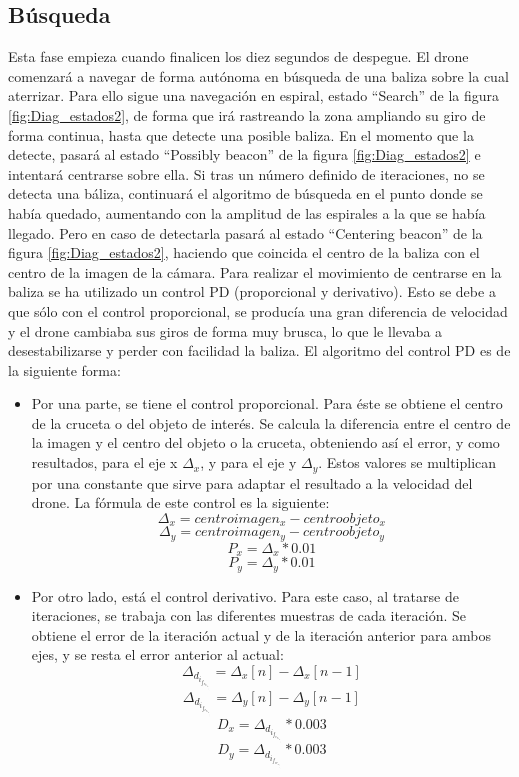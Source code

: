 \subsection{B\'usqueda}
\hspace{1 cm} Esta fase empieza cuando finalicen los diez segundos de despegue. El drone comenzar\'a a navegar de forma aut\'onoma en b\'usqueda de una baliza sobre la cual aterrizar. Para ello sigue una navegaci\'on en espiral, estado "`Search"' de la figura \ref{fig:Diag_estados2}, de forma que ir\'a rastreando la zona ampliando su giro de forma continua, hasta que detecte una posible baliza. En el momento que la detecte, pasar\'a al estado "`Possibly beacon"' de la figura \ref{fig:Diag_estados2} e intentar\'a centrarse sobre ella. Si tras un n\'umero definido de iteraciones, no se detecta una b\'aliza, continuar\'a el algoritmo de b\'usqueda en el punto donde se hab\'ia quedado, aumentando con la amplitud de las espirales a la que se hab\'ia llegado. Pero en caso de detectarla pasar\'a al estado "`Centering beacon"' de la figura \ref{fig:Diag_estados2}, haciendo que coincida el centro de la baliza con el centro de la imagen de la c\'amara. Para realizar el movimiento de centrarse en la baliza se ha utilizado un control PD (proporcional y derivativo). Esto se debe a que s\'olo con el control proporcional, se produc\'ia una gran diferencia de velocidad y el drone cambiaba sus giros de forma muy brusca, lo que le llevaba a desestabilizarse y perder con facilidad la baliza. El algoritmo del control PD es de la siguiente forma:

\begin{itemize}
\item Por una parte, se tiene el control proporcional. Para \'este se obtiene el centro de la cruceta o del objeto de inter\'es. Se calcula la diferencia entre el centro de la imagen y el centro del objeto o la cruceta, obteniendo as\'i el error, y como resultados, para el eje x $\Delta_x$,  y para el eje y $\Delta_y$. Estos valores se multiplican por una constante que sirve para adaptar el resultado a la velocidad del drone. La f\'ormula de este control es la siguiente:  \[\Delta_x = centroimagen_x - centroobjeto_x\]   \[\Delta_y = centroimagen_y - centroobjeto_y\]  \[ P_x = \Delta_x * 0.01\]  \[P_y = \Delta_y * 0.01\]


\item Por otro lado, est\'a el control derivativo. Para este caso, al tratarse de iteraciones, se trabaja con las diferentes muestras de cada iteración. Se obtiene el error de la iteraci\'on actual y de la iteraci\'on anterior para ambos ejes, y se resta el error anterior al actual: \[\Delta_d_i_f_e_r_e_n_c_i_a_x =  \Delta_x [n] - \Delta_x [n-1] \] \[\Delta_d_i_f_e_r_e_n_c_i_a_y =  \Delta_y [n] - \Delta_y [n-1] \]  \[ D_x = \Delta_d_i_f_e_r_e_n_c_i_a_x * 0.003\]  \[D_y = \Delta_d_i_f_e_r_e_n_c_i_a_y * 0.003\]

\end{itemize}

